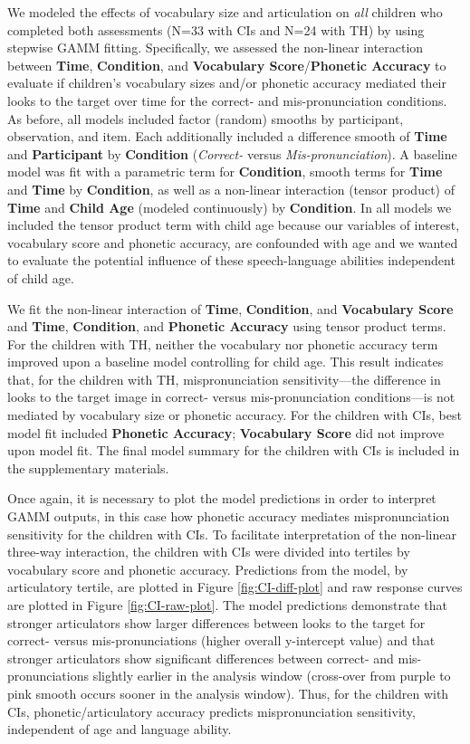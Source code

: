 \documentclass[
]{article}
\begin{document}
We modeled the effects of vocabulary size and articulation on \emph{all} children who completed both assessments (N=33 with CIs and N=24 with TH) by using stepwise GAMM fitting. Specifically, we assessed the non-linear interaction between \textbf{Time}, \textbf{Condition}, and \textbf{Vocabulary Score}/\textbf{Phonetic Accuracy} to evaluate if children's vocabulary sizes and/or phonetic accuracy mediated their looks to the target over time for the correct- and mis-pronunciation conditions. As before, all models included factor (random) smooths by participant, observation, and item. Each additionally included a difference smooth of \textbf{Time} and \textbf{Participant} by \textbf{Condition} (\emph{Correct-} versus \emph{Mis-pronunciation}). A baseline model was fit with a parametric term for \textbf{Condition}, smooth terms for \textbf{Time} and \textbf{Time} by \textbf{Condition}, as well as a non-linear interaction (tensor product) of \textbf{Time} and \textbf{Child Age} (modeled continuously) by \textbf{Condition}. In all models we included the tensor product term with child age because our variables of interest, vocabulary score and phonetic accuracy, are confounded with age and we wanted to evaluate the potential influence of these speech-language abilities independent of child age.

We fit the non-linear interaction of \textbf{Time}, \textbf{Condition}, and \textbf{Vocabulary Score} and \textbf{Time}, \textbf{Condition}, and \textbf{Phonetic Accuracy} using tensor product terms. For the children with TH, neither the vocabulary nor phonetic accuracy term improved upon a baseline model controlling for child age. This result indicates that, for the children with TH, mispronunciation sensitivity---the difference in looks to the target image in correct- versus mis-pronunciation conditions---is not mediated by vocabulary size or phonetic accuracy. For the children with CIs, best model fit included \textbf{Phonetic Accuracy}; \textbf{Vocabulary Score} did not improve upon model fit. The final model summary for the children with CIs is included in the supplementary materials.

Once again, it is necessary to plot the model predictions in order to interpret GAMM outputs, in this case how phonetic accuracy mediates mispronunciation sensitivity for the children with CIs. To facilitate interpretation of the non-linear three-way interaction, the children with CIs were divided into tertiles by vocabulary score and phonetic accuracy. Predictions from the model, by articulatory tertile, are plotted in Figure \ref{fig:CI-diff-plot} and raw response curves are plotted in Figure \ref{fig:CI-raw-plot}. The model predictions demonstrate that stronger articulators show larger differences between looks to the target for correct- versus mis-pronunciations (higher overall y-intercept value) and that stronger articulators show significant differences between correct- and mis-pronunciations slightly earlier in the analysis window (cross-over from purple to pink smooth occurs sooner in the analysis window). Thus, for the children with CIs, phonetic/articulatory accuracy predicts mispronunciation sensitivity, independent of age and language ability.
\end{document}
